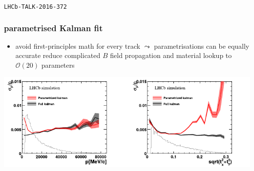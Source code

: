 \documentclass[table,xcolor=dvipsnames,professionalfonts]{beamer}
\begin{document}
\begin{frame}
\begin{columns}
\begin{column}{.5\textwidth}
    \end{column}
    \end{columns}
  {\footnotesize{\texttt{LHCb-TALK-2016-372}}}
\end{frame}

\begin{frame}[t]
  \frametitle{parametrised Kalman fit}
  \begin{itemize}
    \item avoid first-principles math for every track
      \newline $\leadsto$ parametrisations can be equally accurate
      \newline reduce complicated $B$ field propagation and material lookup to $\mathcal{O}(20)$ parameters
  \end{itemize}
  \includegraphics[width=\textwidth]{./param.pdf}
\end{frame}
\end{document}
